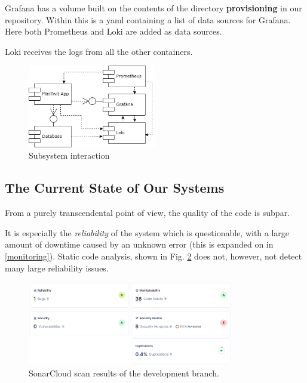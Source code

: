 Grafana has a volume built on the contents of the directory \textbf{provisioning} in our repository. Within this is a yaml containing a list of data sources for Grafana. Here both Prometheus and Loki are added as data sources.

Loki receives the logs from all the other containers.

\begin{figure}[H]%
\begin {center}
\includegraphics[width=0.5\textwidth]{figures/subsystems.drawio.png}
\caption{Subsystem interaction}
\label{fig:subsystems}
\end {center}
\end{figure}

\subsection{The Current State of Our Systems}

From a purely transcendental point of view, the quality of the code is subpar. 

It is especially the \emph{reliability} of the system which is questionable, with a large amount of downtime caused by an unknown error (this is expanded on in \ref{monitoring}). Static code analysis, shown in Fig. \ref{fig:sonarcloud} does not, however, not detect many large reliability issues.

\begin{figure}[h]
\centering
\includegraphics[width=0.8\textwidth]{figures/SonarCloudUpdated.png}
\caption{SonarCloud scan results of the development branch.}
\label{fig:sonarcloud}
\end{figure}

